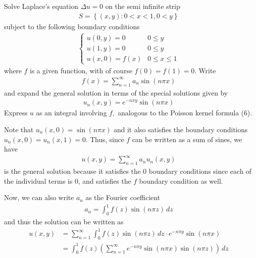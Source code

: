 \documentclass{article}
\begin{document}
\begin{enumerate}
  \ii Solve Laplace's equation $\Delta u=0$ on the semi infinite strip
  \begin{align*}
    S=\left\{ (x, y):0<x<1, 0<y \right\}
  \end{align*}
  subject to the following boundary conditions
  \begin{align*}
    \begin{cases}
      u(0, y)=0 & 0\le y \\
      u(1, y)=0 & 0\le y \\
      u(x, 0)=f(x) & 0\le x\le 1
    \end{cases}
  \end{align*}
  where $f$ is a given function, with of course $f(0)=f(1)=0.$ Write
  \begin{align*}
    f(x) = \sum_{n=1}^{\infty} a_n \sin(n\pi x)
  \end{align*}
  and expand the general solution in terms of the special solutions given by
  \begin{align*}
    u_n(x, y) = e^{-n\pi y}\sin(n\pi x)
  \end{align*}
  Express $u$ as an integral involving $f,$ analogous to the Poisson kernel formula (6).
  \begin{soln}
    Note that $u_n(x, 0)=\sin (n\pi x)$ and it also satisfies the boundary conditions $u_n(x, 0)=u_n(x, 1)=0.$ Thus, since $f$ can be written as a sum of sines, we have
    \begin{align*}
      u(x, y) = \sum_{n=1}^{\infty} a_n u_n(x, y)
    \end{align*}
    is the general solution because it satisfies the 0 boundary conditions since each of the individual terms is 0, and satisfies the $f$ boundary condition as well. 

    Now, we can also write $a_n$ as the Fourier coefficient 
    \begin{align*}
      a_n = \int_0^1 f(z) \sin (n\pi z)\, dz
    \end{align*}
    and thus the solution can be written as
    \begin{align*}
      u(x, y) &= \sum_{n=1}^{\infty} \int_0^1 f(z)\sin (n\pi z)\, dz \cdot e^{-n\pi y}\sin(n\pi x) \\
      &= \int_0^1 f(z) \left(\sum_{n=1}^{\infty} e^{-n\pi y}\sin (n\pi x) \sin (n\pi z)\right) \, dz
    \end{align*}
  \end{soln}

\end{enumerate}
\end{document}
